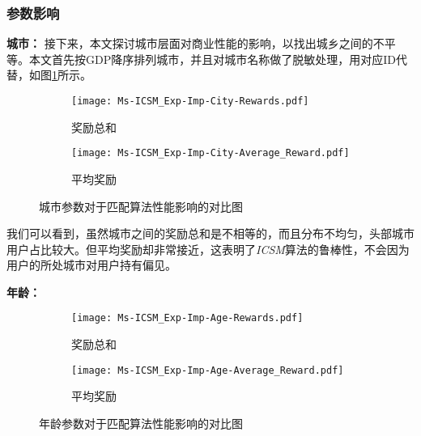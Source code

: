 \subsubsection{参数影响}
\textbf{城市：}
接下来，本文探讨城市层面对商业性能的影响，以找出城乡之间的不平等。本文首先按GDP降序排列城市，并且对城市名称做了脱敏处理，用对应ID代替，如图\ref{Fig:Exp-Imp-City}所示。\par

\begin{figure}[htb]
	\centering
	\begin{subfigure}[t]{0.49\linewidth}
		\captionsetup{justification=centering} %
		\begin{minipage}[b]{1\linewidth}
			\texttt{[image: Ms-ICSM\_Exp-Imp-City-Rewards.pdf]}
			\caption{奖励总和}
		\end{minipage}
	\end{subfigure}
	\begin{subfigure}[t]{0.49\linewidth}
		\captionsetup{justification=centering} %
		\begin{minipage}[b]{1\linewidth}
			\texttt{[image: Ms-ICSM\_Exp-Imp-City-Average\_Reward.pdf]}
			\caption{平均奖励}
		\end{minipage}
	\end{subfigure}	
	\caption{城市参数对于匹配算法性能影响的对比图}
	\label{Fig:Exp-Imp-City}
\end{figure}
我们可以看到，虽然城市之间的奖励总和是不相等的，而且分布不均匀，头部城市用户占比较大。但平均奖励却非常接近，这表明了\emph{ICSM}算法的鲁棒性，不会因为用户的所处城市对用户持有偏见。

\textbf{年龄：}
\begin{figure}[!htb]
	\centering
	\begin{subfigure}[t]{0.49\linewidth}
		\captionsetup{justification=centering} %
		\begin{minipage}[b]{1\linewidth}
			\texttt{[image: Ms-ICSM\_Exp-Imp-Age-Rewards.pdf]}
			\caption{奖励总和}
		\end{minipage}
	\end{subfigure}
	\begin{subfigure}[t]{0.49\linewidth}
		\captionsetup{justification=centering} %
		\begin{minipage}[b]{1\linewidth}
			\texttt{[image: Ms-ICSM\_Exp-Imp-Age-Average\_Reward.pdf]}
			\caption{平均奖励}
		\end{minipage}
	\end{subfigure}	
	\caption{年龄参数对于匹配算法性能影响的对比图}
	\label{Fig:Exp-Imp-Age}
\end{figure}


